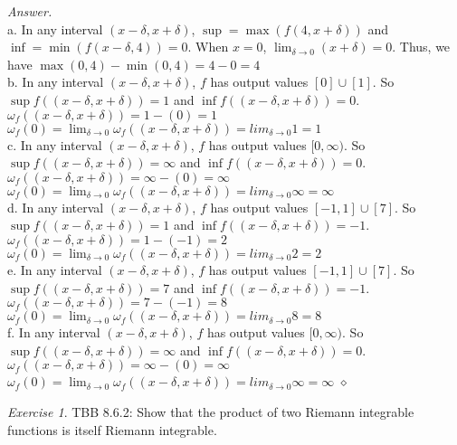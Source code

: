 \documentclass[12pt,oneside]{amsart}
\theoremstyle{definition}
\theoremstyle{remark}
\newtheorem{exer}{Exercise}
\numberwithin{equation}{exer}
\newenvironment{answer}{\bigskip\noindent\emph{Answer.}}{\hfill$\diamond$\newline}
\begin{document}
\begin{answer}
\\
a. In any interval $(x-\delta,x+\delta)$, $\sup=\max(f(4,x+\delta))$ and $\inf=\min(f(x-\delta,4))=0$. When $x=0$, $\lim_{\delta\to 0}(x+\delta)=0$. Thus, we have $\max(0,4)-\min(0,4)=4-0=\boxed{4}$\\
b. In any interval $(x-\delta,x+\delta)$, $f$ has output values $[0]\cup[1]$. So $\sup f((x-\delta,x+\delta))=1$ and $\inf f((x-\delta,x+\delta))=0$. \\
$\omega_f((x-\delta,x+\delta))=1-(0)=1$ \\
$\omega_f(0)=\lim_{\delta\to0}\omega_f((x-\delta,x+\delta))=lim_{\delta\to0}1=\boxed{1}$ \\
c. In any interval $(x-\delta,x+\delta)$, $f$ has output values $[0,\infty)$. So $\sup f((x-\delta,x+\delta))=\infty$ and $\inf f((x-\delta,x+\delta))=0$. \\
$\omega_f((x-\delta,x+\delta))=\infty-(0)=\infty$ \\
$\omega_f(0)=\lim_{\delta\to0}\omega_f((x-\delta,x+\delta))=lim_{\delta\to0}\infty=\boxed{\infty}$  \\
d. In any interval $(x-\delta,x+\delta)$, $f$ has output values $[-1,1]\cup[7]$. So $\sup f((x-\delta,x+\delta))=1$ and $\inf f((x-\delta,x+\delta))=-1$. \\
$\omega_f((x-\delta,x+\delta))=1-(-1)=2$ \\
$\omega_f(0)=\lim_{\delta\to0}\omega_f((x-\delta,x+\delta))=lim_{\delta\to0}2=\boxed{2}$\\
e. In any interval $(x-\delta,x+\delta)$, $f$ has output values $[-1,1]\cup[7]$. So $\sup f((x-\delta,x+\delta))=7$ and $\inf f((x-\delta,x+\delta))=-1$. \\
$\omega_f((x-\delta,x+\delta))=7-(-1)=8$ \\
$\omega_f(0)=\lim_{\delta\to0}\omega_f((x-\delta,x+\delta))=lim_{\delta\to0}8=\boxed{8}$ \\
f. In any interval $(x-\delta,x+\delta)$, $f$ has output values $[0,\infty)$. So $\sup f((x-\delta,x+\delta))=\infty$ and $\inf f((x-\delta,x+\delta))=0$. \\
$\omega_f((x-\delta,x+\delta))=\infty-(0)=\infty$ \\
$\omega_f(0)=\lim_{\delta\to0}\omega_f((x-\delta,x+\delta))=lim_{\delta\to0}\infty=\boxed{\infty}$
\end{answer}
\newpage
\begin{exer}
TBB 8.6.2: Show that the product of two Riemann integrable functions is itself Riemann integrable.
\end{exer}
\end{document}
